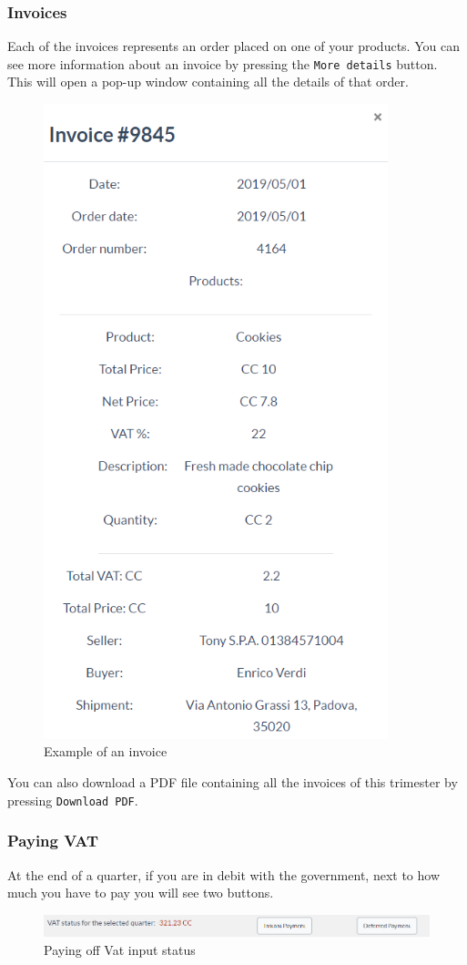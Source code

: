 		\subsubsection{Invoices}
		Each of the invoices represents an order placed on one of your products. 
		You can see more information about an invoice by pressing the 
		\texttt{More details} button. This will open a pop-up window containing all 
		the details of that order.
		\begin{figure}[H]
			\includegraphics[width=10cm]{res/images/invoice_details.png}
			\centering
			\caption{Example of an invoice}
		\end{figure}
		\noindent You can also download a PDF file containing all the invoices 
		of this trimester by pressing \texttt{Download PDF}. 
		\subsubsection{Paying VAT}
		At the end of a quarter, if you are in debit with the government, next 
		to how much you have to pay you will see two buttons.
		\begin{figure}[H]
			\includegraphics[width=15cm]{res/images/paying_vat.png}
			\centering
			\caption{Paying off Vat input status}
		\end{figure}
